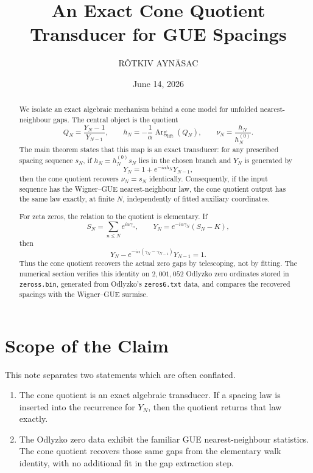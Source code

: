 \documentclass[11pt]{amsart}
\title{An Exact Cone Quotient Transducer for GUE Spacings}
\author{R\^OTKIV AYN\"ASAC}
\date{June 14, 2026}
\numberwithin{equation}{section}
\theoremstyle{plain}
\theoremstyle{definition}
\theoremstyle{remark}
\begin{document}
\begin{abstract}
We isolate an exact algebraic mechanism behind a cone model for unfolded nearest-neighbour gaps. The central object is the quotient
\begin{equation}
Q_N=\frac{Y_N-1}{Y_{N-1}},
\qquad
h_N=-\frac{1}{\alpha}\operatorname{Arg}_{\mathrm{lift}}(Q_N),
\qquad
\nu_N=\frac{h_N}{h_N^{(0)}}.
\label{eq:abstract_quotient}
\end{equation}
The main theorem states that this map is an exact transducer: for any prescribed spacing sequence $s_N$, if $h_N=h_N^{(0)}s_N$ lies in the chosen branch and $Y_N$ is generated by
\begin{equation}
Y_N=1+e^{-i\alpha h_N}Y_{N-1},
\label{eq:abstract_recurrence}
\end{equation}
then the cone quotient recovers $\nu_N=s_N$ identically. Consequently, if the input sequence has the Wigner--GUE nearest-neighbour law, the cone quotient output has the same law exactly, at finite $N$, independently of fitted auxiliary coordinates.

For zeta zeros, the relation to the quotient is elementary. If
\begin{equation}
S_N=\sum_{n\leq N}e^{i\alpha\gamma_n},
\qquad
Y_N=e^{-i\alpha\gamma_N}(S_N-K),
\label{eq:abstract_zeta_walk}
\end{equation}
then
\begin{equation}
Y_N-e^{-i\alpha(\gamma_N-\gamma_{N-1})}Y_{N-1}=1.
\label{eq:abstract_telescoping}
\end{equation}
Thus the cone quotient recovers the actual zero gaps by telescoping, not by fitting. The numerical section verifies this identity on $2{,}001{,}052$ Odlyzko zero ordinates stored in \texttt{zeross.bin}, generated from Odlyzko's \texttt{zeros6.txt} data, and compares the recovered spacings with the Wigner--GUE surmise.
\end{abstract}

\maketitle
\tableofcontents

\section{Scope of the Claim}
\label{sec:scope}

This note separates two statements which are often conflated.
\begin{enumerate}[label=(\arabic*)]
\item The cone quotient is an exact algebraic transducer. If a spacing law is inserted into the recurrence for $Y_N$, then the quotient returns that law exactly.
\item The Odlyzko zero data exhibit the familiar GUE nearest-neighbour statistics. The cone quotient recovers those same gaps from the elementary walk identity, with no additional fit in the gap extraction step.
\end{enumerate}
\end{document}
